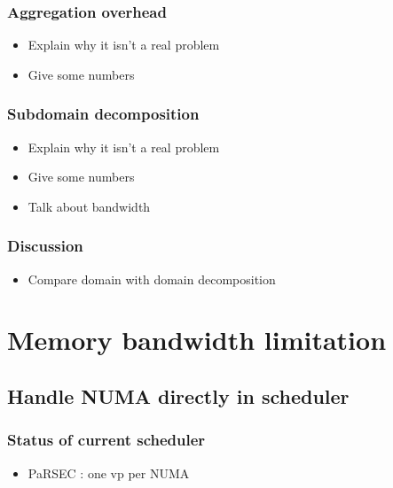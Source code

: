 \documentclass[oneside,12t]{classes/Thesis}
\begin{document}
\subsection{Aggregation overhead}
  \begin{itemize}
    \item Explain why it isn't a real problem
    \item Give some numbers
  \end{itemize}
\subsection{Subdomain decomposition}
  \begin{itemize}
    \item Explain why it isn't a real problem
    \item Give some numbers
    \item Talk about bandwidth
  \end{itemize}
\subsection{Discussion}
  \begin{itemize}
    \item Compare domain with domain decomposition
  \end{itemize}





\chapter{Memory bandwidth limitation}
\minitoc
\vspace{1cm}



\section{Handle NUMA directly in scheduler}
\subsection{Status of current scheduler}
  \begin{itemize}
    \item PaRSEC : one vp per NUMA
  \end{itemize}
\end{document}
